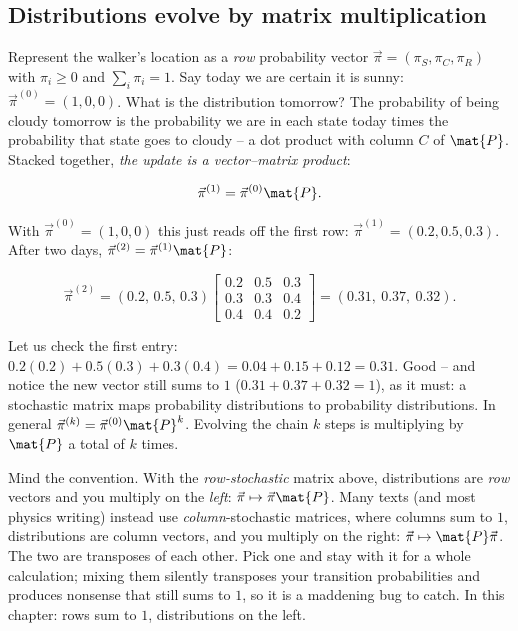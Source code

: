 \subsection{Distributions evolve by matrix multiplication}

Represent the walker's location as a \emph{row} probability vector
$\vec{\pi} = (\pi_S, \pi_C, \pi_R)$ with $\pi_i \ge 0$ and $\sum_i \pi_i = 1$. Say today we
are certain it is sunny: $\vec{\pi}^{(0)} = (1,0,0)$. What is the distribution tomorrow?
The probability of being cloudy tomorrow is the probability we are in each state today times
the probability that state goes to cloudy -- a dot product with column $C$ of $\mat{P}$.
Stacked together, \emph{the update is a vector--matrix product}:

\[
\vec{\pi}^{(1)} = \vec{\pi}^{(0)}\mat{P}.
\]

With $\vec{\pi}^{(0)} = (1,0,0)$ this just reads off the first row:
$\vec{\pi}^{(1)} = (0.2, 0.5, 0.3)$. After two days,
$\vec{\pi}^{(2)} = \vec{\pi}^{(1)}\mat{P}$:

\[
\vec{\pi}^{(2)} = (0.2,\,0.5,\,0.3)
\begin{bmatrix}
0.2 & 0.5 & 0.3\\
0.3 & 0.3 & 0.4\\
0.4 & 0.4 & 0.2
\end{bmatrix}
= (0.31,\ 0.37,\ 0.32).
\]

Let us check the first entry: $0.2(0.2) + 0.5(0.3) + 0.3(0.4) = 0.04 + 0.15 + 0.12 = 0.31$.
Good -- and notice the new vector still sums to $1$ ($0.31+0.37+0.32 = 1$), as it must: a
stochastic matrix maps probability distributions to probability distributions. In general
$\vec{\pi}^{(k)} = \vec{\pi}^{(0)}\mat{P}^k$. Evolving the chain $k$ steps is multiplying by
$\mat{P}$ a total of $k$ times.

\begin{trapbox}
Mind the convention. With the \emph{row-stochastic} matrix above, distributions are
\emph{row} vectors and you multiply on the \emph{left}: $\vec\pi \mapsto \vec\pi\mat{P}$.
Many texts (and most physics writing) instead use \emph{column}-stochastic matrices, where
columns sum to $1$, distributions are column vectors, and you multiply on the right:
$\vec\pi \mapsto \mat{P}\vec\pi$. The two are transposes of each other. Pick one and stay
with it for a whole calculation; mixing them silently transposes your transition
probabilities and produces nonsense that still sums to $1$, so it is a maddening bug to
catch. In this chapter: rows sum to $1$, distributions on the left.
\end{trapbox}

